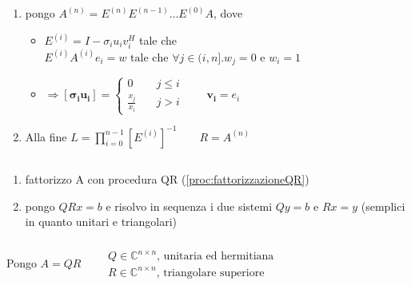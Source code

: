 \begin{proc}[Fattorizzazione LR]\label{proc:fattorizzazioneLR}
\begin{enumerate}
	\item pongo $ A^{(n)} = E^{(n)} E^{(n-1)} \ldots E^{(0)}A $, dove
	\begin{itemize}
		\item $ E^{(i)} = I - \sigma_i u_i v_i^H $ tale che $ E^{(i)}A^{(i)}e_i = w \text{ tale che } \forall j \in (i,n]. w_j = 0 \text{ e } w_i = 1 $
		\item $ \Rightarrow \bm{\left[ \sigma_i u_i \right]} = \left\lbrace \begin{array}{ll}
				0 & \quad j \leq i \\
				\frac{x_j}{x_i} & \quad j > i
			\end{array} \right. \qquad \bm{v_i} = e_i $
	\end{itemize}
	\item Alla fine $ L = \prod_{i = 0}^{n-1} \left[ E^{(i)} \right]^{-1} \qquad R = A^{(n)} $
\end{enumerate}
\end{proc}




\subsection{}


\begin{proc}
\begin{enumerate}
\item fattorizzo A con procedura QR (\ref{proc:fattorizzazioneQR})
\item pongo $ QRx = b $ e risolvo in sequenza i due sistemi $ Qy = b $ e $ Rx = y $ (semplici in quanto unitari e triangolari)
\end{enumerate}
\end{proc}


\subsubsection{}
Pongo $ A = QR \qquad \begin{array}{l}
Q \in \mathbb{C}^{n \times n} \text{, unitaria ed hermitiana} \\
R \in \mathbb{C}^{n \times n} \text{, triangolare superiore}
\end{array} $ 

